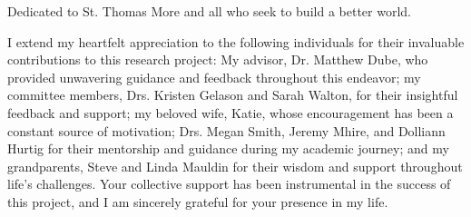 \begin{dedication}
Dedicated to St. Thomas More and all who seek to build a better world.
\end{dedication}

\begin{acknowledgements}
I extend my heartfelt appreciation to the following individuals for their invaluable contributions to this research project:
My advisor, Dr. Matthew Dube, who provided unwavering guidance and feedback throughout this endeavor; my committee members, Drs. Kristen Gelason and Sarah Walton, for their insightful feedback and support; my beloved wife, Katie, whose encouragement has been a constant source of motivation; Drs. Megan Smith, Jeremy Mhire, and Dolliann Hurtig for their mentorship and guidance during my academic journey; and my grandparents, Steve and Linda Mauldin for their wisdom and support throughout life's challenges.
Your collective support has been instrumental in the success of this project, and I am sincerely grateful for your presence in my life.
\end{acknowledgements}

\pagebreak


\tableofcontents

\pagebreak

\listoftables	

\pagebreak
\listoffigures		
\pagebreak		%



\mainmatter

\endinput
